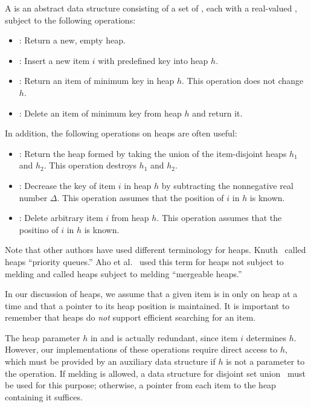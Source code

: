 A  is an abstract data structure consisting of a set of , each
with a real-valued , subject to the following operations:
\begin{itemize}
    \item {}: Return a new, empty heap.
    \item {}: Insert a new item \(i\) with predefined key into heap
        \(h\).
    \item {}: Return an item of minimum key in heap \(h\). This
        operation does not change \(h\).
    \item {}: Delete an item of minimum key from heap \(h\) and
        return it.
\end{itemize}

In addition, the following operations on heaps are often useful:
\begin{itemize}
    \item {}: Return the heap formed by taking the union of the
        item-disjoint heaps \(h_1\) and \(h_2\). This operation destroys \(h_1\) and
        \(h_2\).
    \item {}: Decrease the key of item \(i\) in heap
        \(h\) by subtracting the nonnegative real number \(\Delta\). This operation
        assumes that the position of \(i\) in \(h\) is known.
    \item {}: Delete arbitrary item \(i\) from heap \(h\). This
        operation assumes that the positino of \(i\) in \(h\) is known.
\end{itemize}

Note that other authors have used different terminology for heaps.  Knuth~%
\cite{TAOCP1} called heaps ``priority queues.'' Aho et al.~\cite{Aho+1974} used
this term for heaps not subject to melding and called heaps subject to melding
``mergeable heaps.''

In our discussion of heaps, we assume that a given item is in only on heap at a time
and that a pointer to its heap position is maintained. It is important to remember
that heaps do \emph{not} support efficient searching for an item.

\begin{remark}
    The heap parameter \(h\) in  and  is actually
    redundant, since item \(i\) determines \(h\). However, our implementations of
    these operations require direct access to \(h\), which must be provided by an
    auxiliary data structure if \(h\) is not a parameter to the operation. If melding
	is allowed, a data structure for disjoint set union~\cite{TarjanVanLeeuwen1984}
	must be used for this purpose; otherwise, a pointer from each item to the heap
	containing it suffices.
\end{remark}

